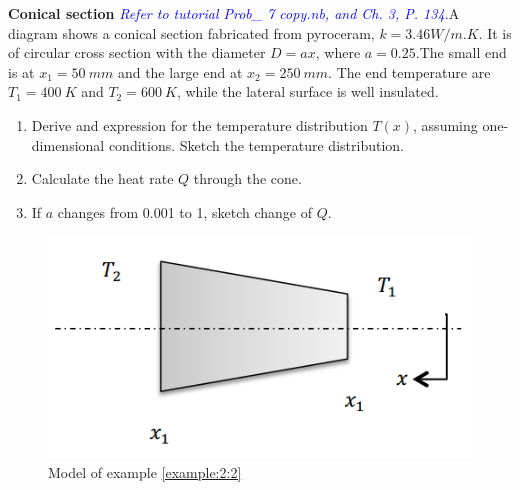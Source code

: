 \begin{example}
\label{example:2:2}
\textbf{Conical section} \textcolor{blue} {\emph{Refer to tutorial 
Prob\_ 7 copy.nb, and Ch. 3, P. 134.}}A diagram shows a conical section 
fabricated from pyroceram, $k=3.46W/m.K$. It is of circular cross section with 
the diameter $D=ax$, where $a=0.25$.The small end is at $x_1=50~mm$ and the large end at $x_2=250~mm$.
The end temperature are $T_1=400~K$ and $T_2=600~K$, while the lateral 
surface is well insulated.
\begin{enumerate}
\item Derive and expression for the temperature distribution $T(x)$,
assuming one-dimensional conditions. Sketch the temperature distribution.
\item Calculate the heat rate $Q$ through the cone.
\item If $a$ changes from 0.001 to 1, sketch change of $Q$.
\end{enumerate}
\begin{figure}[H]
  \centering
    \includegraphics[scale=0.6]{figures/ch2/3}
    \caption{Model of example \ref{example:2:2}}
    \label{fig:2:3}
\end{figure}
\end{example}

